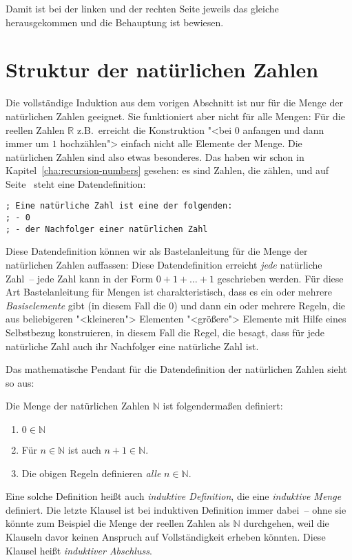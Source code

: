 Damit ist bei der linken und der rechten Seite jeweils das gleiche
herausgekommen und die Behauptung ist bewiesen.

\section{Struktur der natürlichen Zahlen}

Die vollständige Induktion aus dem vorigen Abschnitt ist nur für die
Menge der natürlichen Zahlen geeignet.  Sie funktioniert aber nicht für alle
Mengen: Für die reellen Zahlen $\mathbb{R}$ z.B.\ erreicht die
Konstruktion "<bei $0$ anfangen und dann immer um $1$ hochzählen"> einfach
nicht alle Elemente der Menge.%
Die
natürlichen Zahlen sind also etwas besonderes.  Das haben wir schon in
Kapitel~\ref{cha:recursion-numbers} gesehen: es sind Zahlen, die zählen,
und auf Seite~\pageref{page:datendefinition-N} steht eine
Datendefinition:
%
\begin{lstlisting}
; Eine natürliche Zahl ist eine der folgenden:
; - 0
; - der Nachfolger einer natürlichen Zahl
\end{lstlisting}
%
Diese Datendefinition können wir als Bastelanleitung für die Menge der
natürlichen Zahlen auffassen:
Diese Datendefinition erreicht \emph{jede} natürliche Zahl~-- jede Zahl kann
in der Form $0+1+\ldots+1$ geschrieben werden.  Für diese Art
Bastelanleitung für Mengen ist charakteristisch, dass es ein oder
mehrere \textit{Basiselemente} gibt (in diesem
Fall die $0$) und dann ein oder mehrere Regeln, die aus beliebigeren
"<kleineren"> Elementen "<größere"> Elemente mit Hilfe eines Selbstbezug konstruieren, in diesem
Fall die Regel, die besagt, dass für jede natürliche Zahl auch ihr
Nachfolger eine natürliche Zahl ist.

Das mathematische Pendant für die Datendefinition der natürlichen
Zahlen sieht so aus:
%
\begin{definition}
  \label{def:N}
  Die Menge der natürlichen Zahlen $\mathbb{N}$ ist folgendermaßen definiert:
  \begin{enumerate}
  \item $0\in\mathbb{N}$
  \item Für $n\in\mathbb{N}$ ist auch $n+1\in\mathbb{N}$.
  \item Die obigen Regeln definieren \emph{alle} $n\in\mathbb{N}$.
  \end{enumerate}
\end{definition}
% 
Eine solche Definition heißt auch \textit{induktive
  Definition}, die eine \textit{induktive
  Menge} definiert.  Die letzte Klausel ist bei
induktiven Definition immer dabei~--
ohne sie könnte zum Beispiel die Menge der reellen
Zahlen als $\mathbb{N}$ durchgehen, weil die Klauseln davor 
keinen Anspruch auf Vollständigkeit erheben könnten.  Diese Klausel
heißt \textit{induktiver Abschluss}.

